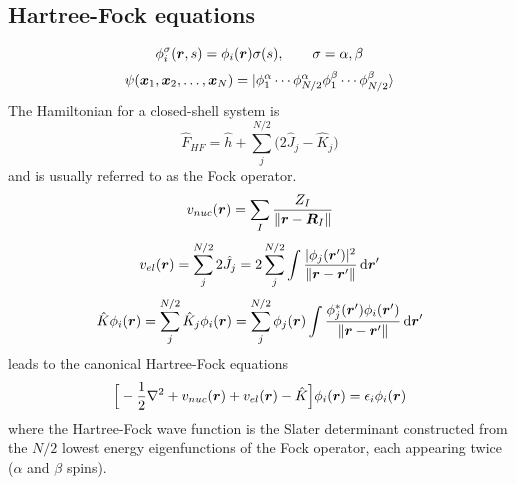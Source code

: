 \subsection{Hartree-Fock equations}
\begin{equation}
    \phi_i^\sigma(\boldsymbol r,s) = \phi_i(\boldsymbol r)\sigma(s), \qquad \sigma = \alpha, \beta
\end{equation}
\begin{equation}
    \psi(\boldsymbol x_1,\boldsymbol x_2,\dots,\boldsymbol x_N) = 
    |\phi_1^\alpha\cdots\phi_{N/2}^\alpha\phi_1^\beta\cdots\phi_{N/2}^\beta\rangle
\end{equation}
The Hamiltonian for a closed-shell system is 
\begin{equation}
    \hat{F}_{HF} = \hat{h} + \sum_j^{N/2} \Big(2\hat{J}_j - \hat{K}_j\Big)
\end{equation}
and is usually referred to as the Fock operator.
\begin{equation}
    v_{nuc}(\boldsymbol r) = \sum_{I} \frac{Z_I}{\|\boldsymbol r - \boldsymbol R_I\|}
\end{equation}
\begin{equation}
    v_{el}(\boldsymbol r) = \sum_j^{N/2} 2\hat{J}_j = 2 \sum_j^{N/2} \int \frac{|\phi_j(\boldsymbol r')|^2}
	{\|\boldsymbol r - \boldsymbol r'\|} \,\mathrm{d} \boldsymbol r'
\end{equation}
\begin{equation}
    \hat{K}\phi_i(\boldsymbol r) = \sum_j^{N/2} \hat{K}_j \phi_i(\boldsymbol r) 
	= \sum_j^{N/2} \phi_j (\boldsymbol r) \int \frac{\phi_j^{\ast}(\boldsymbol r')\phi_i(\boldsymbol r')}
	    {\|\boldsymbol r - \boldsymbol r'\|} \,\mathrm{d} \boldsymbol r'
\end{equation}
leads to the canonical Hartree-Fock equations
\begin{equation}
    \Big[-\frac{1}{2}\nabla^2 + v_{nuc}(\boldsymbol r) + v_{el}(\boldsymbol r) - \hat{K}\Big]\phi_i(\boldsymbol r) 
	= \epsilon_i \phi_i(\boldsymbol r)
\end{equation}
where the Hartree-Fock wave function is the Slater determinant constructed from the $N/2$ lowest
energy eigenfunctions of the Fock operator, each appearing twice ($\alpha$ and $\beta$ spins).


